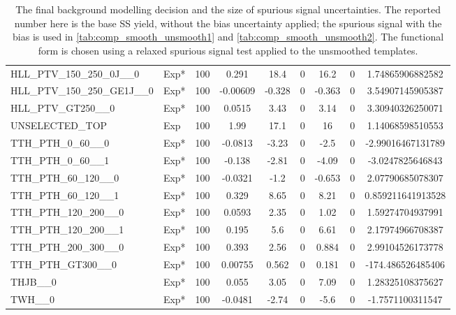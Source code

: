 \begin{table}[!h]
{\begin{tabular}{llccccccS[table-format = 3.2, round-mode = places, round-precision = 2]}
 HLL\_PTV\_150\_250\_0J\_\_0 & Exp* &100&0.291&18.4&0&16.2&0&1.74865906882582\\
 HLL\_PTV\_150\_250\_GE1J\_\_0 & Exp* &100&-0.00609&-0.328&0&-0.363&0&3.54907145905387\\
 HLL\_PTV\_GT250\_\_0 & Exp* &100&0.0515&3.43&0&3.14&0&3.30940326250071\\
 UNSELECTED\_TOP & Exp &100&1.99&17.1&0&16&0&1.14068598510553\\
 TTH\_PTH\_0\_60\_\_0 & Exp* &100&-0.0813&-3.23&0&-2.5&0&-2.99016467131789\\
 TTH\_PTH\_0\_60\_\_1 & Exp* &100&-0.138&-2.81&0&-4.09&0&-3.0247825646843\\
 TTH\_PTH\_60\_120\_\_0 & Exp* &100&-0.0321&-1.2&0&-0.653&0&2.07790685078307\\
 TTH\_PTH\_60\_120\_\_1 & Exp* &100&0.329&8.65&0&8.21&0&0.859211641913528\\
 TTH\_PTH\_120\_200\_\_0 & Exp* &100&0.0593&2.35&0&1.02&0&1.59274704937991\\
 TTH\_PTH\_120\_200\_\_1 & Exp* &100&0.195&5.6&0&6.61&0&2.17974966708387\\
 TTH\_PTH\_200\_300\_\_0 & Exp* &100&0.393&2.56&0&0.884&0&2.99104526173778\\
 TTH\_PTH\_GT300\_\_0 & Exp* &100&0.00755&0.562&0&0.181&0&-174.486526485406\\
 THJB\_\_0 & Exp* &100&0.055&3.05&0&7.09&0&1.28325108375627\\
 TWH\_\_0 & Exp* &100&-0.0481&-2.74&0&-5.6&0&-1.7571100311547\\
       \hline
      \hline
      \end{tabular}
}
      \caption{
The final background modelling decision and the size of spurious signal uncertainties. The reported number here is the base SS yield, without the bias uncertainty applied; the spurious signal with the bias is used in \ref{tab:comp_smooth_unsmooth1} and \ref{tab:comp_smooth_unsmooth2}. The functional form is chosen using a relaxed spurious signal test applied to the unsmoothed templates. \label{tab:spurious_sig_gp2}   }   
\end{table}

